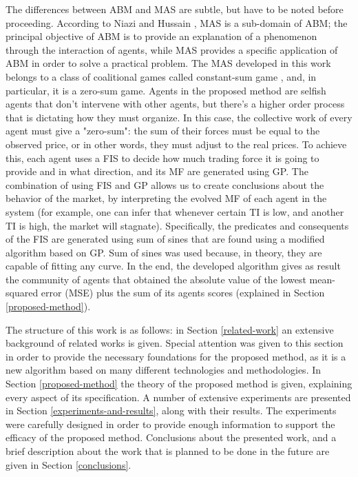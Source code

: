 \documentclass[12pt,journal,compsoc]{IEEEtran}
\begin{document}
The differences between ABM and MAS are subtle, but have to be noted before proceeding. According to Niazi and Hussain \cite{Niazi2011}, MAS is a sub-domain of ABM; the principal objective of ABM is to provide an explanation of a phenomenon through the interaction of agents, while MAS provides a specific application of ABM in order to solve a practical problem. The MAS developed in this work belongs to a class of coalitional games called constant-sum game \cite{Shoham2009}, and, in particular, it is a zero-sum game. Agents in the proposed method are selfish agents that don't intervene with other agents, but there's a higher order process that is dictating how they must organize. In this case, the collective work of every agent must give a "zero-sum": the sum of their forces must be equal to the observed price, or in other words, they must adjust to the real prices. To achieve this, each agent uses a FIS to decide how much trading force it is going to provide and in what direction, and its MF are generated using GP. The combination of using FIS and GP allows us to create conclusions about the behavior of the market, by interpreting the evolved MF of each agent in the system (for example, one can infer that whenever certain TI is low, and another TI is high, the market will stagnate). Specifically, the predicates and consequents of the FIS are generated using sum of sines that are found using a modified algorithm based on GP. Sum of sines was used because, in theory, they are capable of fitting any curve. In the end, the developed algorithm gives as result the community of agents that obtained the absolute value of the lowest mean-squared error (MSE) plus the sum of its agents scores (explained in Section \ref{proposed-method}).

The structure of this work is as follows: in Section \ref{related-work} an extensive background of related works is given. Special attention was given to this section in order to provide the necessary foundations for the proposed method, as it is a new algorithm based on many different technologies and methodologies. In Section \ref{proposed-method} the theory of the proposed method is given, explaining every aspect of its specification. A number of extensive experiments are presented in Section \ref{experiments-and-results}, along with their results. The experiments were carefully designed in order to provide enough information to support the efficacy of the proposed method. Conclusions about the presented work, and a brief description about the work that is planned to be done in the future are given in Section \ref{conclusions}.
  
\end{document}
